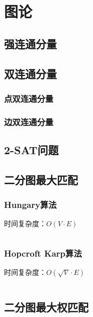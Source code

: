 \documentclass[a4paper]{article}
\newcommand{\cppcode}[1]{
    \inputminted[mathescape]{cpp}{source/#1}
}
\begin{document}
\section{图论}

\subsection{强连通分量}


\subsection{双连通分量}

\subsubsection{点双连通分量}

\subsubsection{边双连通分量}

\subsection{2-SAT问题}


\subsection{二分图最大匹配}

\subsubsection{Hungary算法}

时间复杂度：$O(V \cdot E)$

\cppcode{graph-theory/maximum-matching-hungary.cpp}

\subsubsection{Hopcroft Karp算法}

时间复杂度：$O(\sqrt{V} \cdot E)$

\cppcode{graph-theory/maximum-matching-hopcroft-karp.cpp}

\subsection{二分图最大权匹配}
\end{document}
